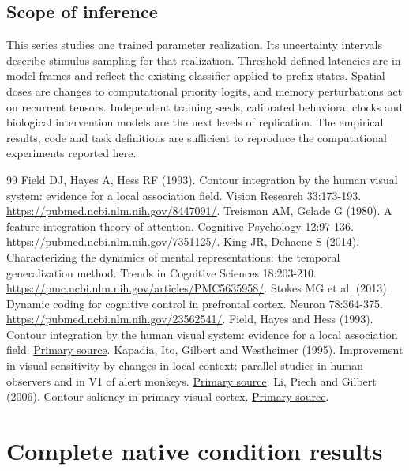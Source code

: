 \documentclass[11pt]{article}
\begin{document}
\subsection{Scope of inference}
This series studies one trained parameter realization. Its uncertainty intervals describe stimulus sampling for that realization. Threshold-defined latencies are in model frames and reflect the existing classifier applied to prefix states. Spatial doses are changes to computational priority logits, and memory perturbations act on recurrent tensors. Independent training seeds, calibrated behavioral clocks and biological intervention models are the next levels of replication. The empirical results, code and task definitions are sufficient to reproduce the computational experiments reported here.

\begin{thebibliography}{99}
 Field DJ, Hayes A, Hess RF (1993). Contour integration by the human visual system: evidence for a local association field. Vision Research 33:173-193. \url{https://pubmed.ncbi.nlm.nih.gov/8447091/}.
 Treisman AM, Gelade G (1980). A feature-integration theory of attention. Cognitive Psychology 12:97-136. \url{https://pubmed.ncbi.nlm.nih.gov/7351125/}.
 King JR, Dehaene S (2014). Characterizing the dynamics of mental representations: the temporal generalization method. Trends in Cognitive Sciences 18:203-210. \url{https://pmc.ncbi.nlm.nih.gov/articles/PMC5635958/}.
 Stokes MG et al. (2013). Dynamic coding for cognitive control in prefrontal cortex. Neuron 78:364-375. \url{https://pubmed.ncbi.nlm.nih.gov/23562541/}.
 Field, Hayes and Hess (1993). Contour integration by the human visual system: evidence for a local association field. \href{https://pubmed.ncbi.nlm.nih.gov/8447091/}{Primary source}.
 Kapadia, Ito, Gilbert and Westheimer (1995). Improvement in visual sensitivity by changes in local context: parallel studies in human observers and in V1 of alert monkeys. \href{https://pubmed.ncbi.nlm.nih.gov/7576633/}{Primary source}.
 Li, Piech and Gilbert (2006). Contour saliency in primary visual cortex. \href{https://pubmed.ncbi.nlm.nih.gov/16772175/}{Primary source}.
\end{thebibliography}\clearpage\appendix\section{Complete native condition results}
\end{document}
